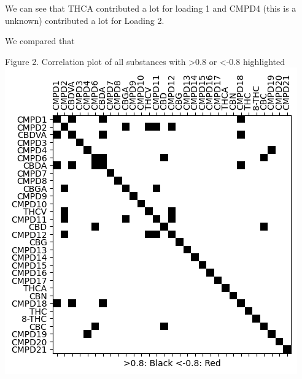 \documentclass{article}
\begin{document}
We can see that THCA contributed a lot for loading 1 and CMPD4 (this is a unknown) contributed a lot for Loading 2. 

We compared that 

{Figure 2. Correlation plot of all substances with >0.8 or <-0.8 highlighted}
\centering
\includegraphics[wdith=\textwidth]{output2.png}
\end{document}
